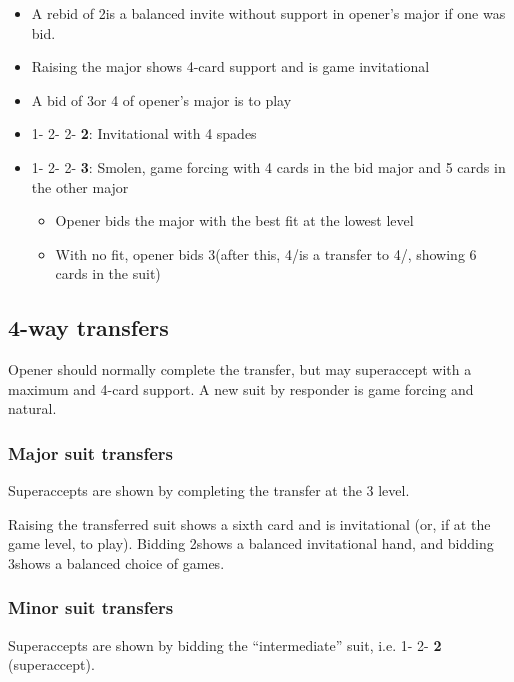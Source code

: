 \begin{itemize}
    \item A rebid of 2\bNs is a balanced invite without support in opener's major if one was bid.
    \item Raising the major shows 4-card support and is game invitational
    \item A bid of 3\bNs or 4 of opener's major is to play
    \item 1\bNs - 2\bCs - 2\bHs - \textbf{2\bS}: Invitational with 4 spades
    \item 1\bNs - 2\bCs - 2\bDs - \textbf{3\bmaj}: Smolen, game forcing with 4 cards in the bid
        major and 5 cards in the other major
        \begin{itemize}
            \item Opener bids the major with the best fit at the lowest level
            \item With no fit, opener bids 3\bN (after this, 4\bD/\bHs is a transfer to 4\bH/\bSs,
                showing 6 cards in the suit)
        \end{itemize}
\end{itemize}

\subsection{4-way transfers}

Opener should normally complete the transfer, but may superaccept with a maximum and 4-card support.
A new suit by responder is game forcing and natural.

\subsubsection{Major suit transfers}

Superaccepts are shown by completing the transfer at the 3 level.

Raising the transferred suit shows a sixth card and is invitational (or, if at the game level, to
play). Bidding 2\bNs shows a balanced invitational hand, and bidding 3\bNs shows a balanced choice
of games.

\subsubsection{Minor suit transfers}

Superaccepts are shown by bidding the ``intermediate'' suit, i.e. 1\bNs - 2\bSs - \textbf{2\bNs}
(superaccept).

